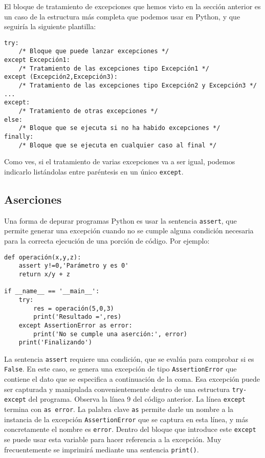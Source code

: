 El bloque de tratamiento de excepciones que hemos visto en la sección anterior es un caso de la estructura más completa que podemos usar en Python, y que seguiría la siguiente plantilla:
\begin{lstlisting}
try:
    /* Bloque que puede lanzar excepciones */
except Excepción1:
    /* Tratamiento de las excepciones tipo Excepción1 */
except (Excepción2,Excepción3):
    /* Tratamiento de las excepciones tipo Excepción2 y Excepción3 */
...
except:
    /* Tratamiento de otras excepciones */
else:
    /* Bloque que se ejecuta si no ha habido excepciones */
finally:
	/* Bloque que se ejecuta en cualquier caso al final */
\end{lstlisting}

Como ves, si el tratamiento de varias excepciones va a ser igual, podemos indicarlo listándolas entre paréntesis en un único \texttt{except}. 

\subsection{Aserciones}

Una forma de depurar programas Python es usar la sentencia \texttt{assert}, que permite generar una excepción cuando no se cumple alguna condición necesaria para la correcta ejecución de una porción de código. Por ejemplo:

\begin{lstlisting}
def operación(x,y,z):
    assert y!=0,'Parámetro y es 0'
    return x/y + z

if __name__ == '__main__':
    try:
        res = operación(5,0,3)
        print('Resultado =',res)
    except AssertionError as error:
        print('No se cumple una aserción:', error)
    print('Finalizando')
\end{lstlisting}

La sentencia \texttt{assert} requiere una condición, que se evalúa para comprobar si es \texttt{False}. En este caso, se genera una excepción de tipo \texttt{AssertionError} que contiene el dato que se especifica a continuación de la coma. Esa excepción puede ser capturada y manipulada convenientemente dentro de una estructura \texttt{try-except} del programa. Observa la línea 9 del código anterior. La línea \texttt{except} termina con \texttt{as error}. La palabra clave \texttt{as} permite darle un nombre a la instancia de la excepción \texttt{AssertionError} que se captura en esta línea, y más concretamente el nombre es \texttt{error}. Dentro del bloque que introduce este \texttt{except} se puede usar esta variable para hacer referencia a la excepción. Muy frecuentemente se imprimirá mediante una sentencia \texttt{print()}.


